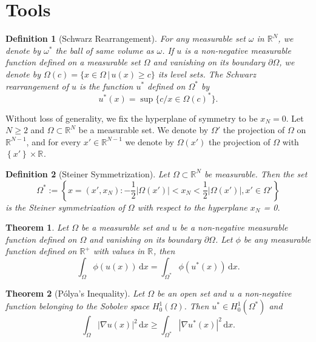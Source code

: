 \documentclass[12pt]{report}
\newtheorem{theorem}{Theorem}[section]
\newtheorem{definition}{Definition}
\numberwithin{definition}{section}
\begin{document}
\break


\section{Tools}

\begin{definition}[Schwarz Rearrangement] \label{schwarz}
  For any measurable set $\omega$ in $\mathbb{R}^{N} $, we denote by $\omega^{*}$ the ball of same volume as $\omega$.
  If $u$ is a non-negative measurable function defined on a measurable set $\Omega$ and vanishing on its boundary $\partial \Omega$,
  we denote by $\Omega(c) = \{ x \in \Omega \,|\, u(x) \geq c \}$ its level sets.
  The Schwarz rearrangement of $u$ is the function $u^{*}$ defined on $\Omega^{*}$ by 
  \[
    u^{*}(x) = \sup\{c / x \in \Omega(c)^{*}\}
  .\] 
  
\end{definition}

Without loss of generality, we fix the hyperplane of symmetry to be $x_{N} = 0$.
Let $N \geq 2$ and $\Omega \subset \mathbb{R}^{N} $ be a measurable set.
We denote by $\Omega'$ the projection of $\Omega$ on $\mathbb{R}^{N-1} $, and for every $x' \in \mathbb{R}^{N-1} $ we denote by $\Omega(x')$ the projection of $\Omega$ with $ \left\{ x' \right\} \times \mathbb{R}^{}  $.

\begin{definition}[Steiner Symmetrization] \label{steiner}
Let $\Omega \subset \mathbb{R}^{N} $ be measurable.
Then the set 
\[
\Omega^{*} := \left\{ x = (x', x_{N}) : - \frac{1}{2} |\Omega(x')| < x_{N} < \frac{1}{2} |\Omega(x')|, x' \in \Omega' \right\} 
\] 
is the Steiner symmetrization of $\Omega$ with respect to the hyperplane $x_{N}$ = 0.
\end{definition}


\begin{theorem} \label {fk1}
 Let $\Omega$ be a measurable set and $u$ be a non-negative measurable function defined on $\Omega$ and vanishing on its boundary $\partial  \Omega$. 
 Let $\phi$ be any measurable function defined on $\mathbb{R}^{+} $ with values in $\mathbb{R}^{} $, then
 \[
   \int_\Omega \! \phi(u(x)) \, \mathrm{d}x = \int_{\Omega^*} \! \phi(u^*(x)) \, \mathrm{d}x  
 .\] 
\end{theorem}

\begin{theorem}[Pólya's Inequality] \label{fk2}
  Let $\Omega$ be an open set and $u$ a non-negative function belonging to the Sobolev space $H_{0}^{1}(\Omega)$.
  Then $u^{*} \in H_{0}^{1}(\Omega^{*})$ and 
  \[
    \int_\Omega \! | \nabla u(x)  |^2  \, \mathrm{d}x \geq \int_{\Omega^{*}} \! | \nabla u^{*}(x) |^2 \, \mathrm{d}x 
  .\] 
\end{theorem}
\end{document}
